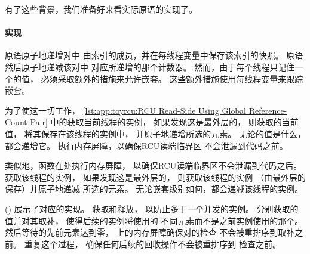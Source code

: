 有了这些背景，我们准备好来看实际原语的实现了。

\paragraph{实现}

原语原子地递增对中
由索引的成员，并在每线程变量中保存该索引的快照。
原语然后原子地递减该对中
对应所递增的那个计数器。
然而，由于每个线程只记住一个的值，
必须采取额外的措施来允许嵌套。
这些额外措施使用每线程变量来跟踪嵌套。

\begin{fcvref}
为了使这一切工作，
\cref{lst:app:toyrcu:RCU Read-Side Using Global Reference-Count Pair}
中的获取当前线程的实例，
如果发现这是最外层的，
则获取的当前值，
将其保存在该线程的实例中，
并原子地递增所选的元素。
无论的值是什么，都会递增它。
执行内存屏障，以确保RCU读端临界区
不会泄漏到代码之前。
\end{fcvref}

\begin{fcvref}
类似地，函数在处执行内存屏障，
以确保RCU读端临界区不会泄漏到代码之后。
获取该线程的实例，
如果发现这是最外层的，
则获取该线程的实例
（由最外层的保存）并原子地递减
所选的元素。
无论嵌套级别如何，都会递减该线程的实例。
\end{fcvref}

\begin{listing}

\caption{使用全局引用计数对的RCU更新}
\label{lst:app:toyrcu:RCU Update Using Global Reference-Count Pair}
\end{listing}

\begin{fcvref}
()
展示了对应的实现。
获取和释放，
以防止多于一个并发的实例。
分别获取的值并对其取补，
使得后续的实例将使用的
不同元素而不是之前实例使用的那个。
然后等待的先前元素达到零，
上的内存屏障确保对的检查
不会被重排序到取补之前。
重复这个过程，
确保任何后续的回收操作不会被重排序到
检查之前。
\end{fcvref}

